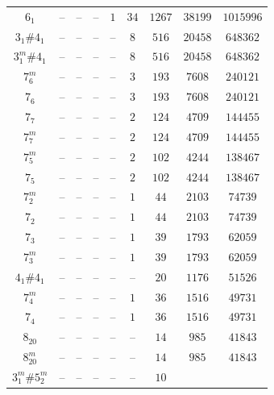 \documentclass[amsmath,secnumarabic,floatfix,amssymb,nofootinbib,nobibnotes,letterpaper,11pt,tightenlines,showkeys]{revtex4}
\theoremstyle{definition}
\begin{document}
\begin{table}[tp]
\begin{ruledtabular}
\begin{tabular}{ccccccccc}
$6_{1}^{}$ & 
-- & 
-- & 
-- & 
$\num{1}$ & 
$\num{34}$ & 
$\num{1267}$ & 
$\num{38199}$ & 
$\num{1015996}$\\ 
$3_{1}^{}\#4_{1}^{}$ & 
-- & 
-- & 
-- & 
-- & 
$\num{8}$ & 
$\num{516}$ & 
$\num{20458}$ & 
$\num{648362}$\\ 
$3_{1}^{m}\#4_{1}^{}$ & 
-- & 
-- & 
-- & 
-- & 
$\num{8}$ & 
$\num{516}$ & 
$\num{20458}$ & 
$\num{648362}$\\ 
$7_{6}^{m}$ & 
-- & 
-- & 
-- & 
-- & 
$\num{3}$ & 
$\num{193}$ & 
$\num{7608}$ & 
$\num{240121}$\\ 
$7_{6}^{}$ & 
-- & 
-- & 
-- & 
-- & 
$\num{3}$ & 
$\num{193}$ & 
$\num{7608}$ & 
$\num{240121}$\\ 
$7_{7}^{}$ & 
-- & 
-- & 
-- & 
-- & 
$\num{2}$ & 
$\num{124}$ & 
$\num{4709}$ & 
$\num{144455}$\\ 
$7_{7}^{m}$ & 
-- & 
-- & 
-- & 
-- & 
$\num{2}$ & 
$\num{124}$ & 
$\num{4709}$ & 
$\num{144455}$\\ 
$7_{5}^{m}$ & 
-- & 
-- & 
-- & 
-- & 
$\num{2}$ & 
$\num{102}$ & 
$\num{4244}$ & 
$\num{138467}$\\ 
$7_{5}^{}$ & 
-- & 
-- & 
-- & 
-- & 
$\num{2}$ & 
$\num{102}$ & 
$\num{4244}$ & 
$\num{138467}$\\ 
$7_{2}^{m}$ & 
-- & 
-- & 
-- & 
-- & 
$\num{1}$ & 
$\num{44}$ & 
$\num{2103}$ & 
$\num{74739}$\\ 
$7_{2}^{}$ & 
-- & 
-- & 
-- & 
-- & 
$\num{1}$ & 
$\num{44}$ & 
$\num{2103}$ & 
$\num{74739}$\\ 
$7_{3}^{}$ & 
-- & 
-- & 
-- & 
-- & 
$\num{1}$ & 
$\num{39}$ & 
$\num{1793}$ & 
$\num{62059}$\\ 
$7_{3}^{m}$ & 
-- & 
-- & 
-- & 
-- & 
$\num{1}$ & 
$\num{39}$ & 
$\num{1793}$ & 
$\num{62059}$\\ 
$4_{1}^{}\#4_{1}^{}$ & 
-- & 
-- & 
-- & 
-- & 
-- & 
$\num{20}$ & 
$\num{1176}$ & 
$\num{51526}$\\ 
$7_{4}^{m}$ & 
-- & 
-- & 
-- & 
-- & 
$\num{1}$ & 
$\num{36}$ & 
$\num{1516}$ & 
$\num{49731}$\\ 
$7_{4}^{}$ & 
-- & 
-- & 
-- & 
-- & 
$\num{1}$ & 
$\num{36}$ & 
$\num{1516}$ & 
$\num{49731}$\\ 
$8_{20}^{}$ & 
-- & 
-- & 
-- & 
-- & 
-- & 
$\num{14}$ & 
$\num{985}$ & 
$\num{41843}$\\ 
$8_{20}^{m}$ & 
-- & 
-- & 
-- & 
-- & 
-- & 
$\num{14}$ & 
$\num{985}$ & 
$\num{41843}$\\ 
$3_{1}^{m}\#5_{2}^{m}$ & 
-- & 
-- & 
-- & 
-- & 
-- & 
$\num{10}$ & 

\end{tabular}
\end{ruledtabular}
\end{table}
\end{document}
